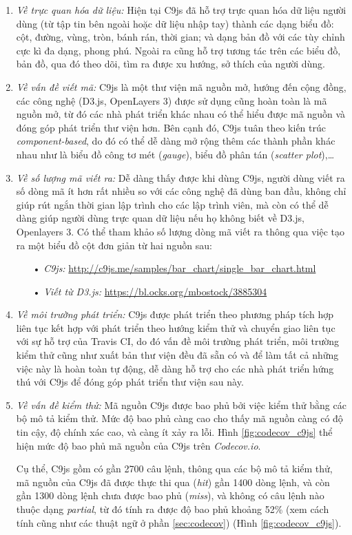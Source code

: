 \documentclass[12pt,a4paper]{article}
\begin{document}
\begin{enumerate}
\item \emph{Về trực quan hóa dữ liệu:} Hiện tại C9js đã hỗ trợ trực quan hóa dữ liệu người dùng (từ tập tin bên ngoài hoặc dữ liệu nhập tay) thành các dạng biểu đồ: cột, đường, vùng, tròn, bánh rán, thời gian; và dạng bản đồ với các tùy chỉnh cực kì đa dạng, phong phú. Ngoài ra cũng hỗ trợ tương tác trên các biểu đồ, bản đồ, qua đó theo dõi, tìm ra được xu hướng, sở thích của người dùng.
\item \emph{Về vấn đề viết mã:} C9js là một thư viện mã nguồn mở, hướng đến cộng đồng, các công nghệ (D3.js, OpenLayers 3) được sử dụng cũng hoàn toàn là mã nguồn mở, từ đó các nhà phát triển khác nhau có thể hiểu được mã nguồn và đóng góp phát triển thư viện hơn. Bên cạnh đó, C9js tuân theo kiến trúc \textit{component-based}, do đó có thể dễ dàng mở rộng thêm các thành phần khác nhau như là biểu đồ công tơ mét (\textit{gauge}), biểu đồ phân tán (\textit{scatter plot}),…
\item \emph{Về số lượng mã viết ra:} Dễ dàng thấy được khi dùng C9js, người dùng viết ra số dòng mã ít hơn rất nhiều so với các công nghệ đã dùng ban đầu, không chỉ giúp rút ngắn thời gian lập trình cho các lập trình viên, mà còn có thể dễ dàng giúp người dùng trực quan dữ liệu nếu họ không biết về D3.js, Openlayers 3. Có thể tham khảo số lượng dòng mã viết ra thông qua việc tạo ra một biểu đồ cột đơn giản từ hai nguồn sau:
	\begin{itemize}
	\item[•] \emph{C9js:} \url{http://c9js.me/samples/bar_chart/single_bar_chart.html}
	\item[•] \emph{Viết từ D3.js: } \url{https://bl.ocks.org/mbostock/3885304
}
	\end{itemize}
\item \emph{Về môi trường phát triển:} C9js được phát triển theo phương pháp tích hợp liên tục kết hợp với phát triển theo hướng kiểm thử và chuyển giao liên tục với sự hỗ trợ của Travis CI, do đó vấn đề môi trường phát triển, môi trường kiểm thử cũng như xuất bản thư viện đều đã sẵn có và để làm tất cả những việc này là hoàn toàn tự động, dễ dàng hỗ trợ cho các nhà phát triển hứng thú với C9js để đóng góp phát triển thư viện sau này.
\item \emph{Về vấn đề kiểm thử:} Mã nguồn C9js được bao phủ bởi việc kiểm thử bằng các bộ mô tả kiểm thử. Mức độ bao phủ càng cao cho thấy mã nguồn càng có độ tin cậy, độ chính xác cao, và càng ít xảy ra lỗi. Hình \ref{fig:codecov_c9js} thể hiện mức độ bao phủ mã nguồn của C9js trên \textit{Codecov.io}\cite{codecov_c9js}.

Cụ thể, C9js gồm có gần 2700 câu lệnh, thông qua các bộ mô tả kiểm thử, mã nguồn của C9js đã được thực thi qua (\textit{hit}) gần 1400 dòng lệnh, và còn gần 1300 dòng lệnh chưa được bao phủ (\textit{miss}), và không có câu lệnh nào thuộc dạng \textit{partial}, từ đó tính ra được độ bao phủ khoảng 52\% (xem cách tính cũng như các thuật ngữ ở phần \ref{sec:codecov}) (Hình \ref{fig:codecov_c9js}).
\end{enumerate}
\end{document}
